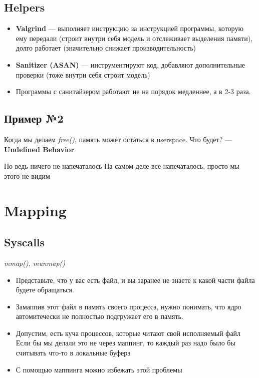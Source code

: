 \documentclass[../../lectures.tex]{subfiles}
\begin{document}
\subsection{Helpers}
\begin{itemize}
    \item \textbf{Valgrind} --- выполняет инструкцию за инструкцией программы, которую ему передали 
          (строит внутри себя модель и отслеживает выделения памяти), долго работает 
          (значительно снижает производительность)
    \item \textbf{Sanitizer (ASAN)} --- инструментируют код, добавляют дополнительные проверки (тоже внутри себя строит модель)
    \item Программы с санитайзером работают не на порядок медленнее, а в 2-3 раза.
\end{itemize}

\subsection{Пример №2}
Когда мы делаем \emph{free()}, память может остаться в userspace.
Что будет? --- \textbf{Undefined Behavior}

Но ведь ничего не напечаталось
На самом деле все напечаталось, просто мы этого не видим

\section{Mapping}

\subsection{Syscalls}
\emph{mmap(), munmap()}
\begin{itemize}
    \item Представьте, что у вас есть файл, и вы заранее не знаете к какой части файла будете обращаться.
    \item Замаппив этот файл в память своего процесса, нужно понимать, что ядро автомитечески не полностью подгружает его в память.
    \item Допустим, есть куча процессов, которые читают свой исполняемый файл\\
          Если бы мы делали это не через маппинг, то каждый раз надо было бы считывать что-то в локальные буфера
    \item С помощью маппинга можно избежать этой проблемы
\end{itemize}
\end{document}
